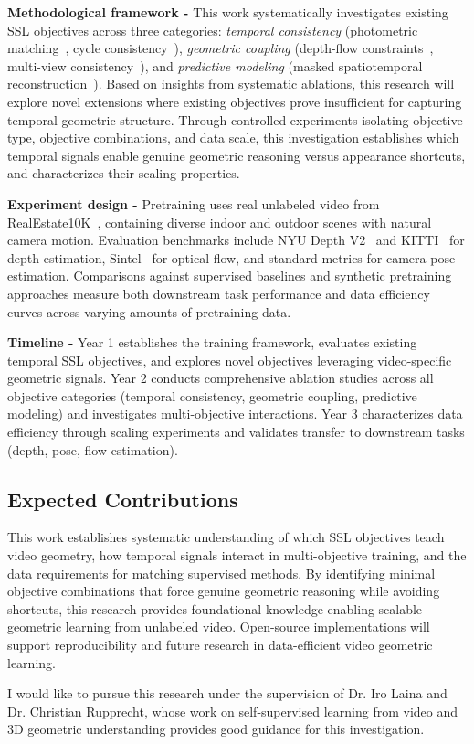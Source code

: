 \documentclass{article}
\begin{document}
\textbf{Methodological framework - }This work systematically investigates existing SSL objectives across three categories: \textit{temporal consistency} (photometric matching~\cite{godard2019}, cycle consistency~\cite{cyclesfm}), \textit{geometric coupling} (depth-flow constraints~\cite{geonet}, multi-view consistency~\cite{vggt}), and \textit{predictive modeling} (masked spatiotemporal reconstruction~\cite{videomae}). Based on insights from systematic ablations, this research will explore novel extensions where existing objectives prove insufficient for capturing temporal geometric structure. Through controlled experiments isolating objective type, objective combinations, and data scale, this investigation establishes which temporal signals enable genuine geometric reasoning versus appearance shortcuts, and characterizes their scaling properties.\newpage

\textbf{Experiment design - }Pretraining uses real unlabeled video from RealEstate10K~\cite{realestate10k}, containing diverse indoor and outdoor scenes with natural camera motion. Evaluation benchmarks include NYU Depth V2~\cite{nyu} and KITTI~\cite{kitti} for depth estimation, Sintel~\cite{sintel} for optical flow, and standard metrics for camera pose estimation. Comparisons against supervised baselines \cite{vggt} and synthetic pretraining approaches \cite{geo4d} measure both downstream task performance and data efficiency curves across varying amounts of pretraining data.

\textbf{Timeline - }Year 1 establishes the training framework, evaluates existing temporal SSL objectives, and explores novel objectives leveraging video-specific geometric signals. Year 2 conducts comprehensive ablation studies across all objective categories (temporal consistency, geometric coupling, predictive modeling) and investigates multi-objective interactions. Year 3 characterizes data efficiency through scaling experiments and validates transfer to downstream tasks (depth, pose, flow estimation).

\subsection{Expected Contributions}

This work establishes systematic understanding of which SSL objectives teach video geometry, how temporal signals interact in multi-objective training, and the data requirements for matching supervised methods. By identifying minimal objective combinations that force genuine geometric reasoning while avoiding shortcuts, this research provides foundational knowledge enabling scalable geometric learning from unlabeled video. Open-source implementations will support reproducibility and future research in data-efficient video geometric learning.


I would like to pursue this research under the supervision of Dr. Iro Laina and 
Dr. Christian Rupprecht, whose work on self-supervised learning from video 
\cite{karazija2025,n3f} and 3D geometric understanding \cite{vggt} provides good 
guidance for this investigation.

\newpage
\printbibliography[title={References}]
\end{document}
